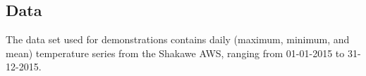 \documentclass[a4paper, 10pt, conference]{ieeeconf}      %
\begin{document}
\subsection{Data}
	\noindent
The data set used for demonstrations contains daily (maximum, minimum, and mean) temperature series from the Shakawe AWS, ranging from 01-01-2015 to 31-12-2015.
\end{document}
